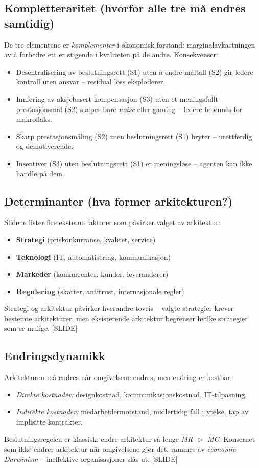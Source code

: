 \subsection*{Kompletter\-aritet (hvorfor alle tre må endres samtidig)}

De tre elementene er \emph{komplementer} i økonomisk forstand: marginalavkastningen av å forbedre ett er stigende i kvaliteten på de andre. Konsekvenser:
\begin{itemize}
\item Desentralisering av beslutningsrett (S1) uten å endre måltall (S2) gir ledere kontroll uten ansvar -- residual loss eksploderer.
\item Innføring av aksjebasert kompensasjon (S3) uten et meningsfullt prestasjonsmål (S2) skaper bare \emph{noise} eller gaming -- ledere belønnes for makroflaks.
\item Skarp prestasjonsmåling (S2) uten beslutningsrett (S1) bryter  -- urettferdig og demotiverende.
\item Insentiver (S3) uten beslutningsrett (S1) er meningsløse -- agenten kan ikke handle på dem.
\end{itemize}

\subsection*{Determinanter (hva former arkitekturen?)}

Slidene lister fire eksterne faktorer som påvirker valget av arkitektur:
\begin{itemize}
\item \textbf{Strategi} (priskonkurranse, kvalitet, service)
\item \textbf{Teknologi} (IT, automatisering, kommunikasjon)
\item \textbf{Markeder} (konkurrenter, kunder, leverandører)
\item \textbf{Regulering} (skatter, antitrust, internasjonale regler)
\end{itemize}
Strategi og arkitektur påvirker hverandre toveis -- valgte strategier krever bestemte arkitekturer, men eksisterende arkitektur begrenser hvilke strategier som er mulige. [SLIDE]

\subsection*{Endringsdynamikk}

Arkitekturen må endres når omgivelsene endres, men endring er kostbar:
\begin{itemize}
\item \emph{Direkte kostnader:} designkostnad, kommunikasjonskostnad, IT-tilpasning.
\item \emph{Indirekte kostnader:} medarbeidermotstand, midlertidig fall i ytelse, tap av implisitte kontrakter.
\end{itemize}
Beslutningsregelen er klassisk: endre arkitektur så lenge \emph{MR $>$ MC}. Konsernet som ikke endrer arkitektur når omgivelsene gjør det, rammes av \emph{economic Darwinism} -- ineffektive organisasjoner slås ut. [SLIDE]

